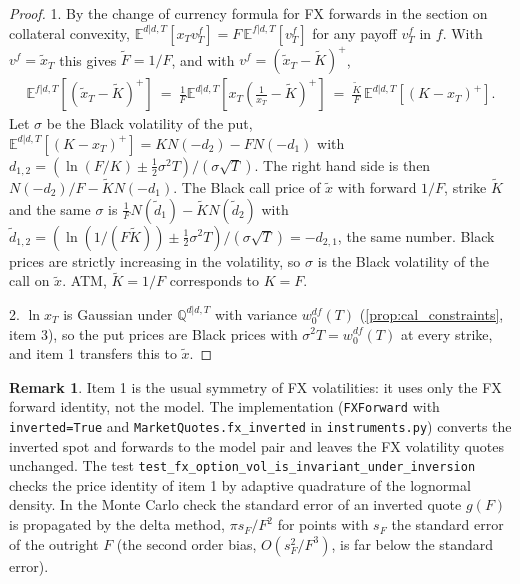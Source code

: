 \documentclass[11pt,english]{amsart}
\newcommand{\EE}{\mathbb{E}}
\newcommand{\QQ}{\mathbb{Q}}
\theoremstyle{definition}
\newtheorem{rema}{Remark}
\begin{document}
\begin{proof}
1. By the change of currency formula for FX forwards in the section on collateral convexity, $\EE^{d|d,T}[x_Tv^f_T] = F\,\EE^{f|d,T}[v^f_T]$ for any payoff $v^f_T$ in $f$. With $v^f = \tilde{x}_T$ this gives $\tilde{F} = 1/F$, and with $v^f = (\tilde{x}_T-\tilde{K})^+$,
\begin{eqnarray*}
  \EE^{f|d,T}\left[(\tilde{x}_T-\tilde{K})^+\right] ~=~ \frac{1}{F}\EE^{d|d,T}\left[x_T\left(\tfrac{1}{x_T}-\tilde{K}\right)^+\right] ~=~ \frac{\tilde{K}}{F}\,\EE^{d|d,T}\left[(K-x_T)^+\right] .
\end{eqnarray*}
Let $\sigma$ be the Black volatility of the put, $\EE^{d|d,T}[(K-x_T)^+] = KN(-d_2)-FN(-d_1)$ with $d_{1,2} = (\ln(F/K)\pm\frac{1}{2}\sigma^2T)/(\sigma\sqrt{T})$. The right hand side is then $N(-d_2)/F - \tilde{K}N(-d_1)$. The Black call price of $\tilde{x}$ with forward $1/F$, strike $\tilde{K}$ and the same $\sigma$ is $\frac{1}{F}N(\tilde{d}_1)-\tilde{K}N(\tilde{d}_2)$ with $\tilde{d}_{1,2} = (\ln(1/(F\tilde{K}))\pm\frac{1}{2}\sigma^2T)/(\sigma\sqrt{T}) = -d_{2,1}$, the same number. Black prices are strictly increasing in the volatility, so $\sigma$ is the Black volatility of the call on $\tilde{x}$. ATM, $\tilde{K} = 1/F$ corresponds to $K = F$.

2. $\ln x_T$ is Gaussian under $\QQ^{d|d,T}$ with variance $w^{df}_0(T)$ (\autoref{prop:cal_constraints}, item 3), so the put prices are Black prices with $\sigma^2T = w^{df}_0(T)$ at every strike, and item 1 transfers this to $\tilde{x}$.
\end{proof}

\begin{rema}
Item 1 is the usual symmetry of FX volatilities: it uses only the FX forward identity, not the model. The implementation (\texttt{FXForward} with \texttt{inverted=True} and \texttt{MarketQuotes.}\allowbreak\texttt{fx\_inverted} in \texttt{instruments.py}) converts the inverted spot and forwards to the model pair and leaves the FX volatility quotes unchanged. The test \texttt{test\_fx\_option\_vol\_is\_}\allowbreak\texttt{invariant\_under\_inversion} checks the price identity of item 1 by adaptive quadrature of the lognormal density. In the Monte Carlo check the standard error of an inverted quote $g(F)$ is propagated by the delta method, $\pi s_F/F^2$ for points with $s_F$ the standard error of the outright $F$ (the second order bias, $O(s_F^2/F^3)$, is far below the standard error).
\end{rema}
\end{document}

